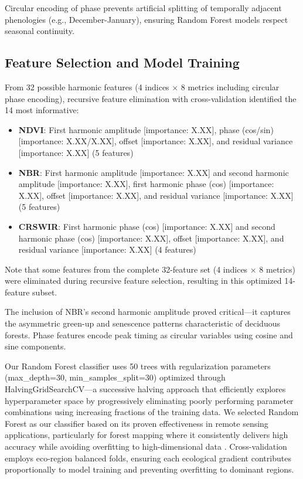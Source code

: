 \documentclass[utf8]{FrontiersinHarvard}
\begin{document}
Circular encoding of phase prevents artificial splitting of temporally adjacent phenologies (e.g., December-January), ensuring Random Forest models respect seasonal continuity.

\subsection{Feature Selection and Model Training}

From 32 possible harmonic features (4 indices × 8 metrics including circular phase encoding), recursive feature elimination with cross-validation identified the 14 most informative:

\begin{itemize}
    \item \textbf{NDVI}: First harmonic amplitude [importance: X.XX], phase (cos/sin) [importance: X.XX/X.XX], offset [importance: X.XX], and residual variance [importance: X.XX] (5 features)
    \item \textbf{NBR}: First harmonic amplitude [importance: X.XX] and second harmonic amplitude [importance: X.XX], first harmonic phase (cos) [importance: X.XX], offset [importance: X.XX], and residual variance [importance: X.XX] (5 features)
    \item \textbf{CRSWIR}: First harmonic phase (cos) [importance: X.XX] and second harmonic phase (cos) [importance: X.XX], offset [importance: X.XX], and residual variance [importance: X.XX] (4 features)
\end{itemize}

Note that some features from the complete 32-feature set (4 indices × 8 metrics) were eliminated during recursive feature selection, resulting in this optimized 14-feature subset.

The inclusion of NBR's second harmonic amplitude proved critical—it captures the asymmetric green-up and senescence patterns characteristic of deciduous forests. Phase features encode peak timing as circular variables using cosine and sine components.

Our Random Forest classifier uses 50 trees with regularization parameters (max\_depth=30, min\_samples\_split=30) optimized through HalvingGridSearchCV—a successive halving approach that efficiently explores hyperparameter space by progressively eliminating poorly performing parameter combinations using increasing fractions of the training data. We selected Random Forest as our classifier based on its proven effectiveness in remote sensing applications, particularly for forest mapping where it consistently delivers high accuracy while avoiding overfitting to high-dimensional data \citep{Belgiu2016}. Cross-validation employs eco-region balanced folds, ensuring each ecological gradient contributes proportionally to model training and preventing overfitting to dominant regions.
\end{document}
